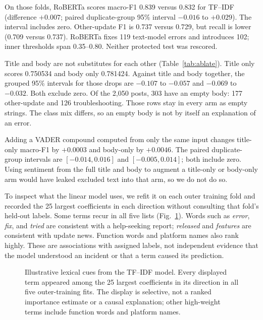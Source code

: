 \documentclass[conference,letterpaper]{IEEEtran}
\begin{document}
On those folds, RoBERTa scores macro-F1 0.839 versus 0.832 for TF--IDF (difference $+0.007$; paired duplicate-group 95\% interval $-0.016$ to $+0.029$). The interval includes zero. Other-update F1 is 0.737 versus 0.729, but recall is lower (0.709 versus 0.737). RoBERTa fixes 119 text-model errors and introduces 102; inner thresholds span 0.35--0.80. Neither protected test was rescored.

Title and body are not substitutes for each other (Table~\ref{tab:ablate}). Title only scores 0.750534 and body only 0.781424. Against title and body together, the grouped 95\% intervals for those drops are $-0.107$ to $-0.057$ and $-0.069$ to $-0.032$. Both exclude zero. Of the 2,050 posts, 303 have an empty body: 177 other-update and 126 troubleshooting. Those rows stay in every arm as empty strings. The class mix differs, so an empty body is not by itself an explanation of an error.

Adding a VADER compound computed from only the same input changes title-only macro-F1 by $+0.0003$ and body-only by $+0.0046$. The paired duplicate-group intervals are $[-0.014,0.016]$ and $[-0.005,0.014]$; both include zero. Using sentiment from the full title and body to augment a title-only or body-only arm would have leaked excluded text into that arm, so we do not do so.

To inspect what the linear model uses, we refit it on each outer training fold and recorded the 25 largest coefficients in each direction without consulting that fold's held-out labels. Some terms recur in all five lists (Fig.~\ref{fig:terms}). Words such as \emph{error}, \emph{fix}, and \emph{tried} are consistent with a help-seeking report; \emph{released} and \emph{features} are consistent with update news. Function words and platform names also rank highly. These are associations with assigned labels, not independent evidence that the model understood an incident or that a term caused its prediction.

\begin{figure}[t]
\centering
{}
\caption{Illustrative lexical cues from the TF--IDF model. Every displayed term appeared among the 25 largest coefficients in its direction in all five outer-training fits. The display is selective, not a ranked importance estimate or a causal explanation; other high-weight terms include function words and platform names.}
\label{fig:terms}
\end{figure}
\end{document}
